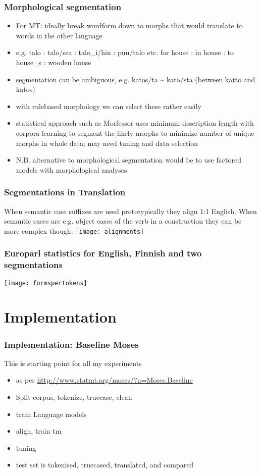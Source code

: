 \documentclass{beamer}
\begin{document}
\begin{frame}
    \frametitle{Morphological segmentation}
    \begin{itemize}
        \item For MT: ideally break wordform down to morphs that would translate
            to words in the other language
        \item e.g. talo : talo/ssa : talo\_i/hin : puu/talo etc. for house : in house : to house\_s : wooden house
        \item segmentation can be ambiguous, e.g. katos/ta \textasciitilde{}
            kato/sta (between katto and katos)
        \item with rulebased morphology we can select these rather easily
        \item statistical approach such as Morfessor uses minimum description
            length with corpora learning to segment the likely morphs to
            minimize number of unique morphs in whole data; may need tuning
            and data selection
        \item N.B. alternative to morphological segmentation would be to use
            factored models with morphological analyses
    \end{itemize}
\end{frame}

\begin{frame}
    \frametitle{Segmentations in Translation}
    When semantic case suffixes are used prototypically they align 1:1 English.
    When semantic cases are e.g. object cases of the verb in a construction
    they can be more complex though.
    \texttt{[image: alignments]}
\end{frame}

\begin{frame}
    \frametitle{Europarl statistics for English, Finnish and two segmentations}
    \texttt{[image: formspertokens]}
\end{frame}

\section{Implementation}

\begin{frame}
    \frametitle{Implementation: Baseline Moses}
    This is starting point for all my experiments
    \begin{itemize}
        \item as per \url{http://www.statmt.org/moses/?n=Moses.Baseline}
        \item Split corpus, tokenize, truecase, clean
        \item train Language models
        \item align, train tm
        \item tuning
        \item test set is tokenised, truecased, translated, and compared
    \end{itemize}
\end{frame}
\end{document}
